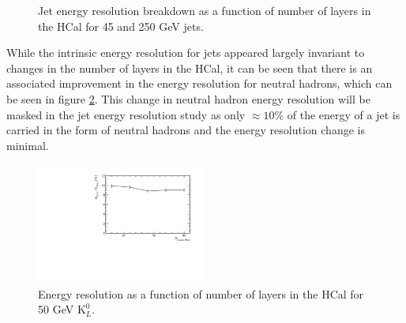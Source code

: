\begin{figure}
\centering
{}
\caption[Jet energy resolution breakdown as a function of number of layers in the HCal for 45 and 250 GeV jets.]{Jet energy resolution breakdown as a function of number of layers in the HCal for 45 and 250 GeV jets.}
\label{fig:hcalnfixedlayersbreak}
\end{figure}

While the intrinsic energy resolution for jets appeared largely invariant to changes in the number of layers in the HCal, it can be seen that there is an associated improvement in the energy resolution for neutral hadrons, which can be seen in figure \ref{fig:hcalnfixedlayerser}.  This change in neutral hadron energy resolution will be masked in the jet energy resolution study as only $\approx 10\%$ of the energy of a jet is carried in the form of neutral hadrons and the energy resolution change is minimal.   

\begin{figure}
\centering
\includegraphics[width=0.5\textwidth]{OptimisationStudies/Plots/EnergyResolution/ER_vs_HCalNFixedLayers_50GeVKaon0L.pdf}
\caption[Energy resolution as a function of number of layers in the HCal for 50 GeV $\text{K}^{0}_{L}$.]{Energy resolution as a function of number of layers in the HCal  for 50 GeV $\text{K}^{0}_{L}$.}
\label{fig:hcalnfixedlayerser}
\end{figure}

